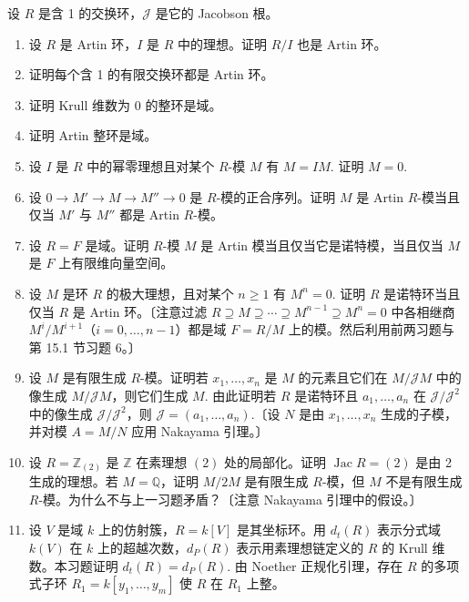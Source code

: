 设 \(R\) 是含 1 的交换环，\(\mathcal{J}\) 是它的 Jacobson 根。

\begin{enumerate}
\item 设 \(R\) 是 Artin 环，\(I\) 是 \(R\) 中的理想。证明 \(R/I\) 也是 Artin 环。

\item 证明每个含 1 的有限交换环都是 Artin 环。

\item 证明 Krull 维数为 0 的整环是域。

\item 证明 Artin 整环是域。

\item 设 \(I\) 是 \(R\) 中的幂零理想且对某个 \(R\)-模 \(M\) 有 \(M = IM\). 证明 \(M = 0\).

\item 设 \(0 \to M' \to M \to M'' \to 0\) 是 \(R\)-模的正合序列。证明 \(M\) 是 Artin \(R\)-模当且仅当 \(M'\) 与 \(M''\) 都是 Artin \(R\)-模。

\item 设 \(R = F\) 是域。证明 \(R\)-模 \(M\) 是 Artin 模当且仅当它是诺特模，当且仅当 \(M\) 是 \(F\) 上有限维向量空间。

\item 设 \(M\) 是环 \(R\) 的极大理想，且对某个 \(n \geq 1\) 有 \(M^n = 0\). 证明 \(R\) 是诺特环当且仅当 \(R\) 是 Artin 环。〔注意过滤 \(R \supseteq M \supseteq \cdots \supseteq M^{n-1} \supseteq M^n = 0\) 中各相继商 \(M^i/M^{i+1}\)（\(i = 0, \ldots, n-1\)）都是域 \(F = R/M\) 上的模。然后利用前两习题与第 15.1 节习题 6。〕

\item 设 \(M\) 是有限生成 \(R\)-模。证明若 \(x_1, \ldots, x_n\) 是 \(M\) 的元素且它们在 \(M/\mathcal{J}M\) 中的像生成 \(M/\mathcal{J}M\)，则它们生成 \(M\). 由此证明若 \(R\) 是诺特环且 \(a_1, \ldots, a_n\) 在 \(\mathcal{J}/\mathcal{J}^2\) 中的像生成 \(\mathcal{J}/\mathcal{J}^2\)，则 \(\mathcal{J} = (a_1, \ldots, a_n)\).〔设 \(N\) 是由 \(x_1, \ldots, x_n\) 生成的子模，并对模 \(A = M/N\) 应用 Nakayama 引理。〕

\item 设 \(R = \mathbb{Z}_{(2)}\) 是 \(\mathbb{Z}\) 在素理想 \((2)\) 处的局部化。证明 \(\operatorname{Jac}R = (2)\) 是由 2 生成的理想。若 \(M = \mathbb{Q}\)，证明 \(M/2M\) 是有限生成 \(R\)-模，但 \(M\) 不是有限生成 \(R\)-模。为什么不与上一习题矛盾？〔注意 Nakayama 引理中的假设。〕

\item 设 \(V\) 是域 \(k\) 上的仿射簇，\(R = k[V]\) 是其坐标环。用 \(d_t(R)\) 表示分式域 \(k(V)\) 在 \(k\) 上的超越次数，\(d_P(R)\) 表示用素理想链定义的 \(R\) 的 Krull 维数。本习题证明 \(d_t(R) = d_P(R)\). 由 Noether 正规化引理，存在 \(R\) 的多项式子环 \(R_1 = k[y_1, \ldots, y_m]\) 使 \(R\) 在 \(R_1\) 上整。


\end{enumerate}
